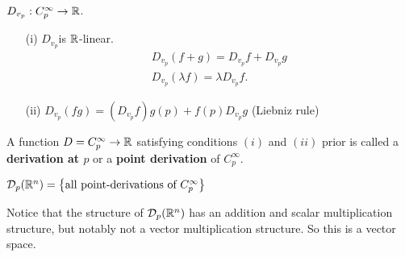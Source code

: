 \documentclass[12pt, twosided]{article}
\begin{document}
\begin{prop}
  \(D_{v_p}: C_p^\infty \to \mathbb{R}\).
  \begin{enumerate}
  \item [(i)] \(D_{v_p}\)is \(\mathbb{R}\)-linear.
    \begin{align*}
      D_{v_p}(f + g) = D_{v_p}f + D_{v_p}g \\
      D_{v_p}(\lambda f) = \lambda D_{v_p}f.
    \end{align*}
  \item [(ii)] \(D_{v_p}(fg) = (D_{v_p}f) g(p) + f(p)D_{v_p}g\) (Liebniz rule)
  \end{enumerate}
\end{prop}
\begin{df}
  A function \(D = C_p^\infty \to \mathbb{R}\) satisfying conditions \((i)\) and \((ii)\) prior is called a \textbf{derivation at \(p\)} or a \textbf{point derivation} of \(C_p^\infty\).
\end{df}
\begin{df}
  \(\mathcal{D}_p(\mathbb{R}^n) = \left\{ \text{all point-derivations of } C_p^\infty\right\}\)
\end{df}

Notice that the structure of \(\mathcal{D}_p(\mathbb{R}^n)\) has an addition and scalar multiplication structure, but notably not a vector multiplication structure. So this is a vector space.
\end{document}

